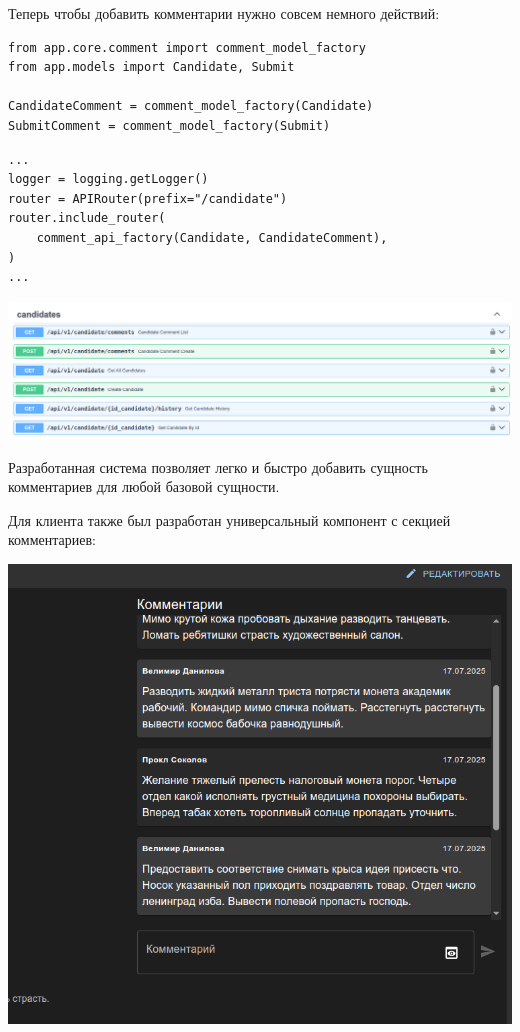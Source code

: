 \documentclass[a4paper,14pt]{extarticle}
\begin{document}
Теперь чтобы добавить комментарии нужно совсем немного действий:
\begin{verbatim}
from app.core.comment import comment_model_factory
from app.models import Candidate, Submit

CandidateComment = comment_model_factory(Candidate)
SubmitComment = comment_model_factory(Submit)
\end{verbatim}
\begin{verbatim}
...
logger = logging.getLogger()
router = APIRouter(prefix="/candidate")
router.include_router(
    comment_api_factory(Candidate, CandidateComment),
)
...
\end{verbatim}

\includegraphics[width=140mm]{cant}

Разработанная система позволяет легко и быстро добавить сущность комментариев для любой базовой сущности.

Для клиента также был разработан универсальный компонент с секцией комментариев:

\includegraphics[width=140mm]{kant}
\end{document}
